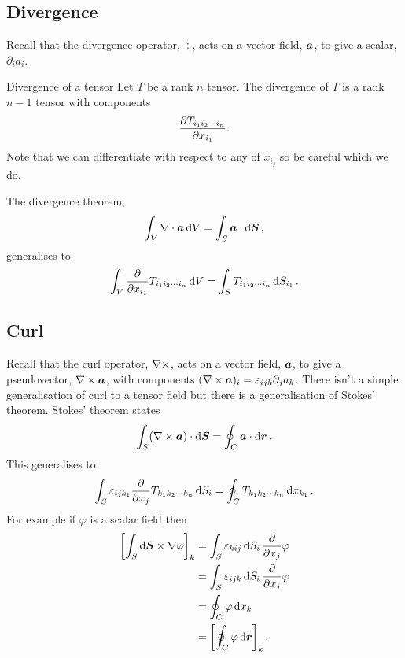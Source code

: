 \subsection{Divergence}
Recall that the divergence operator, \(\div\), acts on a vector field, \(\bm{a}\), to give a scalar, \(\partial_ia_i\).
\begin{definition}{Divergence of a tensor}{}
    Let \(T\) be a rank \(n\) tensor.
    The divergence of \(T\) is a rank \(n - 1\) tensor with components
    \[\pdv{T_{{ {i}_1 {i}_2 \dotsm {i}_{n} }}}{x_{i_1}}.\]
    Note that we can differentiate with respect to any of \(x_{i_j}\) so be careful which we do.
\end{definition}
The divergence theorem,
\[\int_V\nabla\cdot\bm{a} \dd{V} = \int_S \bm{a}\cdot\dd{\bm{S}},\]
generalises to
\[\int_V \pdv{x_{i_1}}T_{{ {i}_1 {i}_2 \dotsm {i}_{n} }} \dd{V} = \int_S T_{{ {i}_1 {i}_2 \dotsm {i}_{n} }}\dd{S_{i_1}}.\]

\subsection{Curl}
Recall that the curl operator, \(\nabla\times\), acts on a vector field, \(\bm{a}\), to give a pseudovector, \(\nabla\times\bm{a}\), with components \((\nabla\times\bm{a})_i = \varepsilon_{ijk}\partial_ja_k\).
There isn't a simple generalisation of curl to a tensor field but there is a generalisation of Stokes' theorem.
Stokes' theorem states
\[\int_S (\nabla\times\bm{a})\cdot\dd{\bm{S}} = \oint_C \bm{a}\cdot\dd{\bm{r}}.\]
This generalises to
\[\int_S \varepsilon_{ijk_1}\pdv{x_{j}}T_{{ {k}_1 {k}_2 \dotsm {k}_{n} }}\dd{S_i} = \oint_C T_{{ {k}_1 {k}_2 \dotsm {k}_{n} }}\dd{x_{k_1}}.\]
For example if \(\varphi\) is a scalar field then
\begin{align*}
    \left[\int_S \dd{\bm{S}} \times \nabla\varphi\right]_k &= \int_S \varepsilon_{kij}\dd{S_i}\pdv{x_j}\varphi\\
    &= \int_S \varepsilon_{ijk}\dd{S_i}\pdv{x_j}\varphi\\
    &= \oint_C \varphi \dd{x_k}\\
    &= \left[\oint_C \varphi \dd{\bm{r}}\right]_k.
\end{align*}

